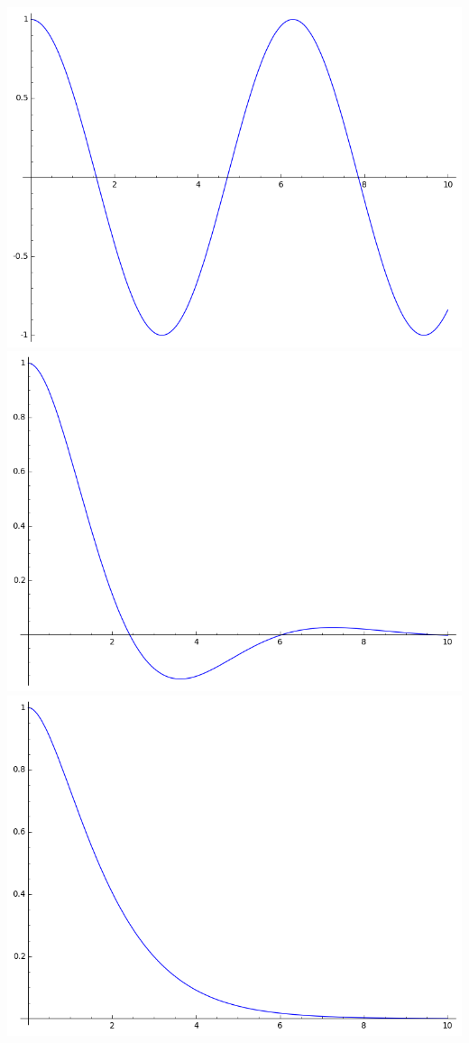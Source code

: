 \documentclass[class=report,crop=false]{standalone}
\begin{document}
\begin{center}
\includegraphics[scale=0.25]{figures/equadiff-ressort1} \quad
\includegraphics[scale=0.25]{figures/equadiff-ressort2} \quad
\includegraphics[scale=0.25]{figures/equadiff-ressort3} 
\end{center}
\end{document}
